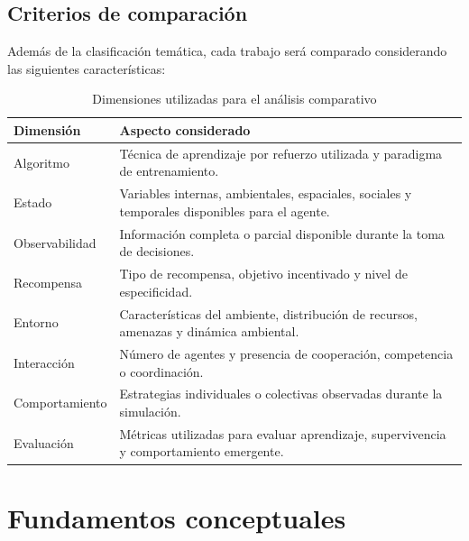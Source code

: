 \documentclass[conference]{IEEEtran}
\begin{document}
\subsection{Criterios de comparación}

Además de la clasificación temática, cada trabajo será comparado
considerando las siguientes características:

\begin{table}[H]
\centering
\caption{Dimensiones utilizadas para el análisis comparativo}
\label{tab:dimensiones}
\small
\begin{tabular}{p{3.5cm} p{4.5cm}}
\toprule
\textbf{Dimensión} & \textbf{Aspecto considerado} \\
\midrule

Algoritmo &
Técnica de aprendizaje por refuerzo utilizada y paradigma de
entrenamiento. \\

Estado &
Variables internas, ambientales, espaciales, sociales y temporales
disponibles para el agente. \\

Observabilidad &
Información completa o parcial disponible durante la toma de
decisiones. \\

Recompensa &
Tipo de recompensa, objetivo incentivado y nivel de especificidad. \\

Entorno &
Características del ambiente, distribución de recursos, amenazas y
dinámica ambiental. \\

Interacción &
Número de agentes y presencia de cooperación, competencia o
coordinación. \\

Comportamiento &
Estrategias individuales o colectivas observadas durante la simulación. \\

Evaluación &
Métricas utilizadas para evaluar aprendizaje, supervivencia y
comportamiento emergente. \\

\bottomrule
\end{tabular}
\end{table}


\section{Fundamentos conceptuales}
\end{document}
